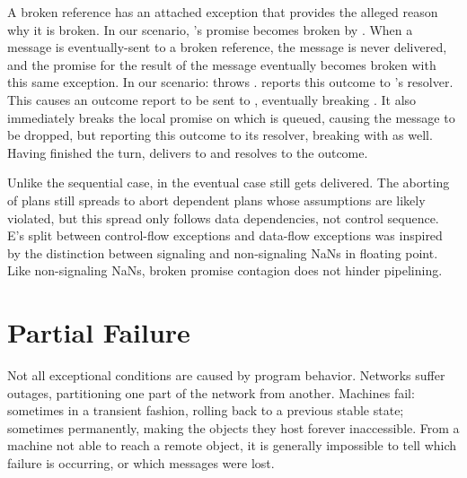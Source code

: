\documentclass{llncs}
\begin{document}
A broken reference has an attached exception that provides the alleged
reason why it is broken. In our scenario, 's promise becomes
broken by . When a message is eventually-sent to a broken
reference, the message is never delivered, and the promise for the
result of the message eventually becomes broken with this same
exception. In our scenario:  throws .  reports
this outcome to 's resolver. This causes an outcome report to
be sent to , eventually breaking . 
%
%
It also immediately breaks the local promise on which  is
queued, causing the  message to be dropped, but reporting
this outcome to its resolver, breaking  with  as
well. 
%
%
Having finished the  turn,  delivers  to
 and resolves  to the outcome.

Unlike the sequential case, in the eventual case  still gets
delivered. The aborting of plans still spreads to abort dependent
plans whose assumptions are likely violated, but this spread only
follows data dependencies, not control sequence. E's split between
control-flow exceptions and data-flow exceptions was inspired by the
distinction between signaling and non-signaling NaNs in floating
point. Like non-signaling NaNs, broken promise contagion does not
hinder pipelining.

\section{Partial Failure}

Not all exceptional conditions are caused by program behavior.
Networks suffer outages, partitioning one part of the network from
another. Machines fail: sometimes in a transient fashion, rolling back
to a previous stable state; sometimes permanently, making the objects
they host forever inaccessible. From a machine not able to reach a
remote object, it is generally impossible to tell which failure is
occurring, or which messages were lost.
\end{document}
